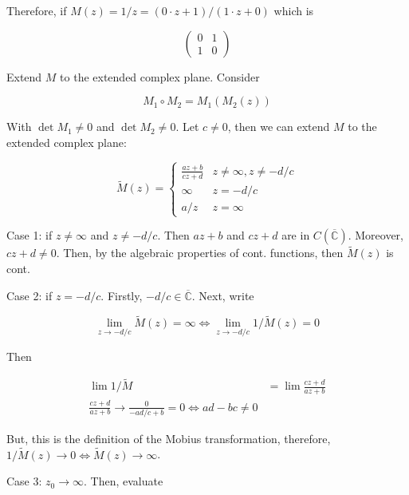\documentclass{article}
\newtheorem{one minute paper}[theorem]{One Minute Paper}
\begin{document}
Therefore, if $M(z) = 1/z = (0 \cdot z + 1)/(1 \cdot z + 0)$ which is 

\begin{equation}
    \begin{pmatrix}
        0 & 1 \\
        1 & 0 
    \end{pmatrix}
\end{equation}

Extend $M$ to the extended complex plane. Consider 

\begin{equation}
    M_1 \circ M_2 = M_1(M_2(z))
\end{equation}

With $\det M_1 \neq 0$ and $\det M_2 \neq 0$. Let $c \neq 0$, then we can extend $M$ to the extended complex plane:

\begin{equation}
    \tilde{M}(z) = \begin{cases}
        \frac{az + b}{cz + d} & z \neq \infty, z \neq -d/c \\
        \infty & z = -d/c \\
        a/z & z = \infty
    \end{cases}
\end{equation}

Case 1: if $z \neq \infty$ and $z \neq -d/c$. Then $az + b$ and $cz + d$ are in $C(\overline{\mathbb{C}})$. Moreover, $cz + d \neq 0$. Then, by the algebraic properties of cont. functions, then $\tilde{M}(z)$ is cont. 

Case 2: if $z = -d/c$. Firstly, $-d/c \in \overline{\mathbb{C}}$. Next, write

\begin{equation}
    \lim_{z \rightarrow -d/c} \tilde{M}(z) = \infty \iff \lim_{z \rightarrow -d/c} 1/\tilde{M}(z) = 0
\end{equation}

Then 

\begin{align}
    \lim 1/\tilde{M} &= \lim \frac{cz + d}{az + b} \\
    \frac{cz + d}{az + b} \rightarrow \frac{0}{- ad/c + b} = 0 \iff ad - bc \neq 0
\end{align}

But, this is the definition of the Mobius transformation, therefore, $1/\tilde{M}(z) \rightarrow 0 \iff \tilde{M}(z) \rightarrow \infty$.

Case 3: $z_0 \rightarrow \infty$. Then, evaluate 
\end{document}
